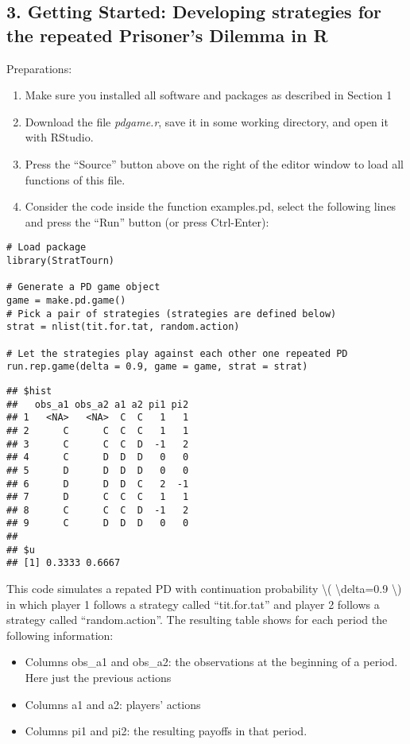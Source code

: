 \documentclass[]{article}
\begin{document}
\subsection{3. Getting Started: Developing strategies for the repeated
Prisoner's Dilemma in R}

Preparations:

\begin{enumerate}
\itemsep1pt\parskip0pt
\item
  Make sure you installed all software and packages as described in
  Section 1
\item
  Download the file \emph{pdgame.r}, save it in some working directory,
  and open it with RStudio.
\item
  Press the ``Source'' button above on the right of the editor window to
  load all functions of this file.
\item
  Consider the code inside the function examples.pd, select the
  following lines and press the ``Run'' button (or press Ctrl-Enter):
\end{enumerate}

\begin{verbatim}
# Load package
library(StratTourn)

# Generate a PD game object
game = make.pd.game()
# Pick a pair of strategies (strategies are defined below)
strat = nlist(tit.for.tat, random.action)

# Let the strategies play against each other one repeated PD
run.rep.game(delta = 0.9, game = game, strat = strat)
\end{verbatim}

\begin{verbatim}
## $hist
##   obs_a1 obs_a2 a1 a2 pi1 pi2
## 1   <NA>   <NA>  C  C   1   1
## 2      C      C  C  C   1   1
## 3      C      C  C  D  -1   2
## 4      C      D  D  D   0   0
## 5      D      D  D  D   0   0
## 6      D      D  D  C   2  -1
## 7      D      C  C  C   1   1
## 8      C      C  C  D  -1   2
## 9      C      D  D  D   0   0
## 
## $u
## [1] 0.3333 0.6667
\end{verbatim}

This code simulates a repated PD with continuation probability
\textbackslash{}( \textbackslash{}delta=0.9 \textbackslash{}) in which
player 1 follows a strategy called ``tit.for.tat'' and player 2 follows
a strategy called ``random.action''. The resulting table shows for each
period the following information:

\begin{itemize}
\itemsep1pt\parskip0pt
\item
  Columns obs\_a1 and obs\_a2: the observations at the beginning of a
  period. Here just the previous actions
\item
  Columns a1 and a2: players' actions
\item
  Columns pi1 and pi2: the resulting payoffs in that period.
\end{itemize}
\end{document}
